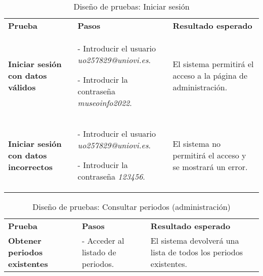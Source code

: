 \begin{table}[H]
\vspace{-4mm}
  \centering
  \caption{Diseño de pruebas: Iniciar sesión}
    \begin{tabular}{p{9em}p{11em}p{16em}}
    \toprule
    \rowcolor[rgb]{ .851,  .886,  .953} \multicolumn{3}{p{36em}}{\textbf{Iniciar sesión}} \\ \midrule
    \rowcolor[rgb]{ .949,  .949,  .949} \textbf{Prueba} & \textbf{Pasos} & \textbf{Resultado esperado}\\ \midrule
    \textbf{Iniciar sesión con datos válidos } & - Introducir el usuario \textit{uo257829@uniovi.es}.\par - Introducir la contraseña \textit{museoinfo2022}. & El sistema permitirá el acceso a la página de administración. \\ \midrule
    \textbf{Iniciar sesión con datos incorrectos} & - Introducir el usuario \textit{uo257829@uniovi.es}.\par - Introducir la contraseña \textit{123456}. & El sistema no permitirá el acceso y se mostrará un error. \\ \bottomrule
    \end{tabular}%
\end{table}%
\begin{table}[H]
\vspace{-4mm}
  \centering
  \caption{Diseño de pruebas: Consultar periodos (administración)}
    \begin{tabular}{p{9em}p{11em}p{16em}}
    \toprule
    \rowcolor[rgb]{ .851,  .886,  .953} \multicolumn{3}{p{36em}}{\textbf{Consultar periodos (administración)}} \\ \midrule
    \rowcolor[rgb]{ .949,  .949,  .949} \textbf{Prueba} & \textbf{Pasos} & \textbf{Resultado esperado}\\ \midrule
    \textbf{Obtener periodos existentes} & - Acceder al listado de periodos. & El sistema devolverá una lista de todos los periodos existentes. \\ \bottomrule
    \end{tabular}%
\end{table}%
